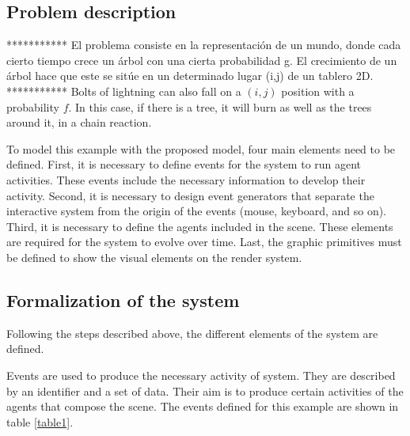 \documentclass[runningheads]{llncs}
\begin{document}
\subsection{Problem description
\label{sec:description_problem}}

*********** El problema consiste en la representación de un mundo, donde cada cierto tiempo crece un árbol con una cierta probabilidad g. El crecimiento de un árbol hace que este se sitúe en un determinado lugar (i,j) de un tablero 2D. 
***********
Bolts of lightning can also fall on a $(i, j)$ position
with a probability $f$. In this case, if there is a tree, it will burn as well as
the trees around it, in a chain reaction.

To model this example with the proposed model, four main elements need to be defined.
First, it is necessary to define events for the system to run agent activities. These events
include the necessary information to develop their activity. Second, it is necessary to design
event generators that separate the interactive system from the origin of the events (mouse, keyboard, and
so on). Third, it is necessary to define the agents included in the scene. These elements are
required for the system to evolve over time. Last, the graphic primitives must be defined to show 
the visual elements on the render system.
	


\subsection{Formalization of the system
\label{sec:formalization_system_model}}

Following the steps described above, the different elements of the system are defined.

Events are used to produce the necessary activity of system. They are described by an
identifier and a set of data. Their aim is to produce certain activities of the agents that
compose the scene. The events defined for this example are shown in table \ref{table1}.
\end{document}
